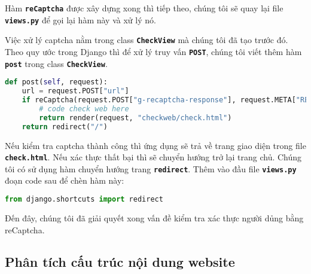 \par
Hàm \textbf{\texttt{reCaptcha}} được xây dựng xong thì tiếp theo, chúng tôi sẽ quay lại file \textbf{\texttt{views.py}} để gọi lại hàm này và xử lý nó.
\par
Việc xử lý captcha nằm trong class \textbf{\texttt{CheckView}} mà chúng tôi đã tạo trước đó. Theo quy ước trong Django thì để xử lý truy vấn \textbf{\texttt{POST}}, chúng tôi viết thêm hàm \textbf{\texttt{post}} trong class \textbf{\texttt{CheckView}}.
\begin{lstlisting}[language=Python]
def post(self, request):
    url = request.POST["url"]
    if reCaptcha(request.POST["g-recaptcha-response"], request.META["REMOTE_ADDR"]):
        # code check web here
        return render(request, "checkweb/check.html")
    return redirect("/")
\end{lstlisting}
\par
Nếu kiểm tra captcha thành công thì ứng dụng sẽ trả về trang giao diện trong file \textbf{\texttt{check.html}}. Nếu xác thực thất bại thì sẽ chuyển hướng trở lại trang chủ. Chúng tôi có sử dụng hàm chuyển hướng trang \textbf{\texttt{redirect}}. Thêm vào đầu file \textbf{\texttt{views.py}} đoạn code sau để chèn hàm này:
\begin{lstlisting}[language=Python]
from django.shortcuts import redirect
\end{lstlisting}
\par
Đến đây, chúng tôi đã giải quyết xong vấn đề kiểm tra xác thực người dủng bằng reCaptcha.
\subsection{Phân tích cấu trúc nội dung website}
